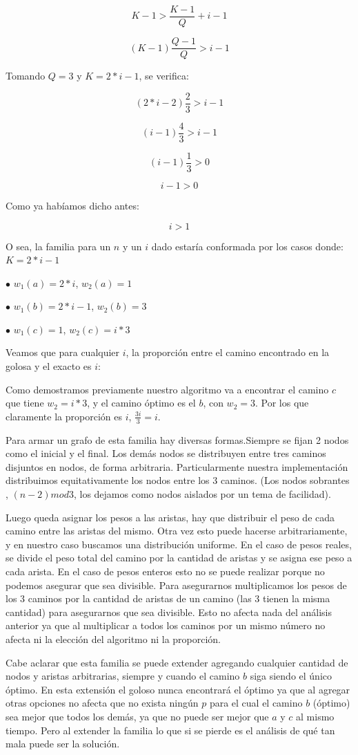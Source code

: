 $$K-1 > \frac{K-1}{Q}+i-1$$

$$(K-1) \frac{Q-1}{Q} > i-1$$

Tomando $Q=3$ y $K=2*i-1$, se verifica:

$$(2*i-2) \frac{2}{3} > i-1$$

$$(i-1) \frac{4}{3} > i-1$$

$$(i-1) \frac{1}{3} > 0$$

$$i-1 > 0$$

Como ya habíamos dicho antes:

$$i > 1$$




O sea, la familia para un $n$ y un $i$ dado estaría conformada por los casos donde: $K = 2*i-1$

$\bullet$ $w_1(a) = 2*i$, $w_2(a)=1$

$\bullet$ $w_1(b) = 2*i-1$, $w_2(b)=3$

$\bullet$ $w_1(c) = 1$, $w_2(c)=i*3$

Veamos que para cualquier $i$, la proporción entre el camino encontrado en la golosa y el exacto es $i$:

Como demostramos previamente nuestro algoritmo va a encontrar el camino $c$ que tiene $w_2=i*3$, y el camino óptimo es el $b$, con $w_2=3$. Por los que claramente la proporción es $i$, $\frac{3i}{3}=i$.

Para armar un grafo de esta familia hay diversas formas.Siempre se fijan 2 nodos como el inicial y el final. Los demás nodos se distribuyen entre tres caminos disjuntos en nodos, de forma arbitraria. Particularmente nuestra implementación distribuimos equitativamente los nodos entre los 3 caminos. (Los nodos sobrantes , $(n-2) mod 3$, los dejamos como nodos aislados por un tema de facilidad).

Luego queda asignar los pesos a las aristas, hay que distribuir el peso de cada camino entre las aristas del mismo. Otra vez esto puede hacerse arbitrariamente, y en nuestro caso buscamos una distribución uniforme.
En el caso de pesos reales, se divide el peso total del camino por la cantidad de aristas y se asigna ese peso a cada arista.
En el caso de pesos enteros esto no se puede realizar porque no podemos asegurar que sea divisible. Para asegurarnos multiplicamos los pesos de los 3 caminos por la cantidad de aristas de un camino (las 3 tienen la misma cantidad) para asegurarnos que sea divisible. Esto no afecta nada del análisis anterior ya que al multiplicar a todos los caminos por un mismo número no afecta ni la elección del algoritmo ni la proporción.

Cabe aclarar que esta familia se puede extender agregando cualquier cantidad de nodos y aristas arbitrarias, siempre y cuando el camino $b$ siga siendo el único óptimo. En esta extensión el goloso nunca encontrará el óptimo ya que al agregar otras opciones no afecta que no exista ningún $p$ para el cual el camino $b$ (óptimo) sea mejor que todos los demás, ya que no puede ser mejor que $a$ y $c$ al mismo tiempo. Pero al extender la familia lo que si se pierde es el análisis de	qué tan mala puede ser la solución.  